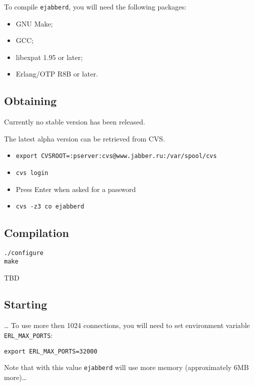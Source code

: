 \documentclass[10pt]{article}
\newcommand{\ejabberd}{\texttt{ejabberd}}
\begin{document}
To compile \ejabberd{}, you will need the following packages:
\begin{itemize}
\item GNU Make;
\item GCC;
\item libexpat 1.95 or later;
\item Erlang/OTP R8B or later.
\end{itemize}

\subsection{Obtaining}
\label{sec:obtaining}

Currently no stable version has been released.

The latest alpha version can be retrieved from CVS\@.
\begin{itemize}
\item \texttt{export CVSROOT=:pserver:cvs@www.jabber.ru:/var/spool/cvs}
\item \texttt{cvs login}
\item Press Enter when asked for a password
\item \texttt{cvs -z3 co ejabberd}
\end{itemize}






\subsection{Compilation}
\label{sec:compilation}

\begin{verbatim}
./configure
make
\end{verbatim}

TBD





\subsection{Starting}
\label{sec:starting}

\ldots{} To use more then 1024 connections, you will need to set environment
variable \texttt{ERL\_MAX\_PORTS}:
\begin{verbatim}
export ERL_MAX_PORTS=32000
\end{verbatim}
Note that with this value \ejabberd{} will use more memory (approximately 6MB
more)\ldots{}
\end{document}
